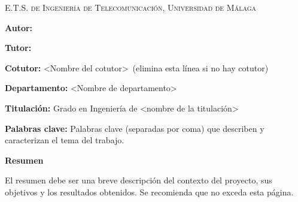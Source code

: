 
\pagestyle{fancy}
\renewcommand{\headrulewidth}{0pt}

\begin{center}
	\scshape
	E.T.S. de Ingeniería de Telecomunicación, Universidad de Málaga
\end{center}

\bigskip

\begin{center}
	\Large \scshape
	\textbf{\tfgtitlename}
\end{center}

\bigskip \bigskip \bigskip

\begin{minipage}{\textwidth}

\textbf{Autor:} \tfgauthorname

\medskip

\textbf{Tutor:} \tfgtutorname

\medskip

\textbf{Cotutor:} <Nombre del cotutor>\ (elimina esta línea si no hay cotutor)

\medskip

\textbf{Departamento:} <Nombre de departamento>

\medskip

\textbf{Titulación:} Grado en Ingeniería de <nombre de la titulación>

\medskip

\textbf{Palabras clave:} Palabras clave (separadas por coma) que describen y caracterizan el tema del trabajo.

\bigskip \bigskip


\end{minipage}

\begin{center}
	\textbf{Resumen}
\end{center}

El resumen debe ser una breve descripción del contexto del proyecto,
sus objetivos y los resultados obtenidos. Se recomienda que no exceda
esta página.


\blankpage
